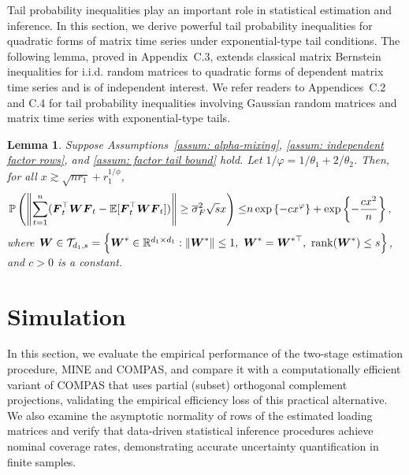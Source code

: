 \documentclass[11pt,letterpaper]{article}
\def\calT{{\cal  T}} \def\cT{{\cal  T}}
\newtheorem{lemma}{Lemma}[section]
\theoremstyle{definition}
\begin{document}
Tail probability inequalities play an important role in statistical estimation and inference. In this section, we derive powerful tail probability inequalities for quadratic forms of matrix time series under exponential-type tail conditions. The following lemma, proved in Appendix~C.3, extends classical matrix Bernstein inequalities for i.i.d. random matrices to quadratic forms of dependent matrix time series and is of independent interest. We refer readers to Appendices~C.2 and C.4 for tail probability inequalities involving Gaussian random matrices and matrix time series with exponential-type tails.





\begin{lemma}\label{lem: concentration GtWG FtWF main text} %
Suppose Assumptions~\ref{assum: alpha-mixing}, \ref{assum: independent factor rows}, and \ref{assum: factor tail bound} hold. Let $1/\varphi = 1/\theta_1 + 2/\theta_2$. Then, for all $x\gtrsim \sqrt{n r_1} + r_1^{1/\phi}$,
\begin{align}
\label{eqn: concentration FtWF main text}
\mathbb{P}\left(\left\|\sum_{t=1}^n (\boldsymbol{F}_t^\top \boldsymbol{W} \boldsymbol{F}_t - \mathbb{E}[\boldsymbol{F}_t^\top \boldsymbol{W} \boldsymbol{F}_t]) \right\| \ge \overline{\sigma}_{F}^2 \sqrt{s}  x \right) 
\le &  n\exp \left\{-c x^\varphi \right\} + \exp \left\{- \frac{c x^2}{n} \right\} ,
\end{align}
where $\bW \in \calT_{d_1, s} =  \left\{ \bW^* \in \RR^{d_1 \times d_1} : \| \bW^* \| \le 1,\ \bW^* = \bW^{*\top},\ {\rm rank}(\bW^*) \le s \right\}$, and $c>0$ is a constant.
\end{lemma}











\section{Simulation}\label{sec:simul}
In this section, we evaluate the empirical performance of the two-stage estimation procedure, MINE and COMPAS, and
compare it with a computationally efficient variant of COMPAS that uses partial (subset) orthogonal complement projections, validating the empirical efficiency loss of this practical alternative. We also examine the asymptotic normality of rows of the estimated loading matrices and verify that data-driven statistical inference procedures achieve nominal coverage rates, demonstrating accurate uncertainty quantification in finite samples.
\end{document}
